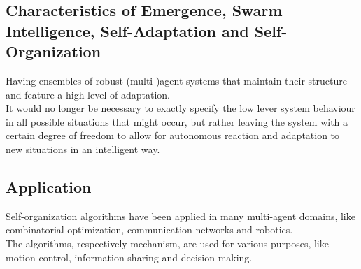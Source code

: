 \subsection{Characteristics of Emergence, Swarm Intelligence, Self-Adaptation and Self-Organization}
Having ensembles of robust (multi-)agent systems that maintain their structure and feature a high level of adaptation.\\
It would no longer be necessary to exactly specify the low lever system behaviour in all possible situations that might occur, but rather leaving the system with a certain degree of freedom to allow for autonomous reaction and adaptation to new situations in an intelligent way.

\subsection{Application}
Self-organization algorithms have been applied in many multi-agent domains, like combinatorial optimization, communication networks and robotics.\\
The algorithms, respectively mechanism, are used for various purposes, like motion control, information sharing and decision making.

